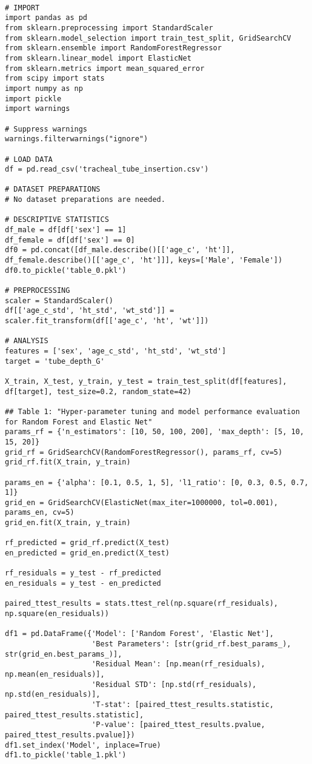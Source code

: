 \documentclass[11pt]{article}
\begin{document}
\begin{verbatim}

# IMPORT
import pandas as pd
from sklearn.preprocessing import StandardScaler
from sklearn.model_selection import train_test_split, GridSearchCV
from sklearn.ensemble import RandomForestRegressor
from sklearn.linear_model import ElasticNet
from sklearn.metrics import mean_squared_error
from scipy import stats
import numpy as np
import pickle
import warnings

# Suppress warnings
warnings.filterwarnings("ignore")

# LOAD DATA
df = pd.read_csv('tracheal_tube_insertion.csv')

# DATASET PREPARATIONS
# No dataset preparations are needed.

# DESCRIPTIVE STATISTICS
df_male = df[df['sex'] == 1]
df_female = df[df['sex'] == 0]
df0 = pd.concat([df_male.describe()[['age_c', 'ht']], df_female.describe()[['age_c', 'ht']]], keys=['Male', 'Female'])
df0.to_pickle('table_0.pkl')

# PREPROCESSING
scaler = StandardScaler()
df[['age_c_std', 'ht_std', 'wt_std']] = scaler.fit_transform(df[['age_c', 'ht', 'wt']])    

# ANALYSIS
features = ['sex', 'age_c_std', 'ht_std', 'wt_std']
target = 'tube_depth_G'

X_train, X_test, y_train, y_test = train_test_split(df[features], df[target], test_size=0.2, random_state=42)

## Table 1: "Hyper-parameter tuning and model performance evaluation for Random Forest and Elastic Net"
params_rf = {'n_estimators': [10, 50, 100, 200], 'max_depth': [5, 10, 15, 20]}
grid_rf = GridSearchCV(RandomForestRegressor(), params_rf, cv=5)
grid_rf.fit(X_train, y_train)

params_en = {'alpha': [0.1, 0.5, 1, 5], 'l1_ratio': [0, 0.3, 0.5, 0.7, 1]}
grid_en = GridSearchCV(ElasticNet(max_iter=1000000, tol=0.001), params_en, cv=5)
grid_en.fit(X_train, y_train)

rf_predicted = grid_rf.predict(X_test)
en_predicted = grid_en.predict(X_test)

rf_residuals = y_test - rf_predicted
en_residuals = y_test - en_predicted

paired_ttest_results = stats.ttest_rel(np.square(rf_residuals), np.square(en_residuals))

df1 = pd.DataFrame({'Model': ['Random Forest', 'Elastic Net'],
                    'Best Parameters': [str(grid_rf.best_params_), str(grid_en.best_params_)],
                    'Residual Mean': [np.mean(rf_residuals), np.mean(en_residuals)],
                    'Residual STD': [np.std(rf_residuals), np.std(en_residuals)],
                    'T-stat': [paired_ttest_results.statistic, paired_ttest_results.statistic],
                    'P-value': [paired_ttest_results.pvalue, paired_ttest_results.pvalue]})
df1.set_index('Model', inplace=True)
df1.to_pickle('table_1.pkl')


\end{verbatim}
\end{document}
